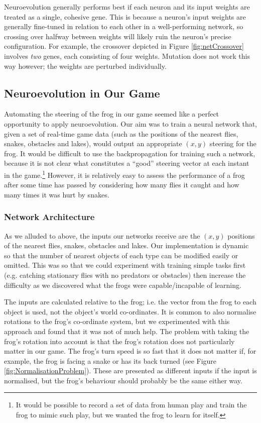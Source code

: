 Neuroevolution generally performs best if each neuron and its input weights are treated as a single, cohesive gene. This is because a neuron's input weights are generally fine-tuned in relation to each other in a well-performing network, so crossing over halfway between weights will likely ruin the neuron's precise configuration. For example, the crossover depicted in Figure \ref{fig:netCrossover} involves \textit{two} genes, each consisting of four weights. Mutation does not work this way however; the weights are perturbed individually.

\subsection{Neuroevolution in Our Game}
Automating the steering of the frog in our game seemed like a perfect opportunity to apply neuroevolution. Our aim was to train a neural network that, given a set of real-time game data (such as the positions of the nearest flies, snakes, obstacles and lakes), would output an appropriate $(x, y)$ steering for the frog. It would be difficult to use the backpropagation for training such a network, because it is not clear what constitutes a ``good'' steering vector at each instant in the game.\footnote{It would be possible to record a set of data from human play and train the frog to mimic such play, but we wanted the frog to learn for itself.} However, it is relatively easy to assess the performance of a frog after some time has passed by considering how many flies it caught and how many times it was hurt by snakes.

\subsubsection{Network Architecture}
As we alluded to above, the inputs our networks receive are the $(x, y)$ positions of the nearest flies, snakes, obstacles and lakes. Our implementation is dynamic so that the number of nearest objects of each type can be modified easily or omitted. This was so that we could experiment with training simple tasks first (e.g. catching stationary flies with no predators or obstacles) then increase the difficulty as we discovered what the frogs were capable/incapable of learning.

The inputs are calculated relative to the frog; i.e. the vector from the frog to each object is used, not the object's world co-ordinates. It is common to also normalise rotations to the frog's co-ordinate system, but we experimented with this approach and found that it was not of much help. The problem with taking the frog's rotation into account is that the frog's rotation does not particularly matter in our game. The frog's turn speed is so fast that it does not matter if, for example, the frog is facing a snake or has its back turned (see Figure \ref{fig:NormalisationProblem}). These are presented as different inputs if the input is normalised, but the frog's behaviour should probably be the same either way.

